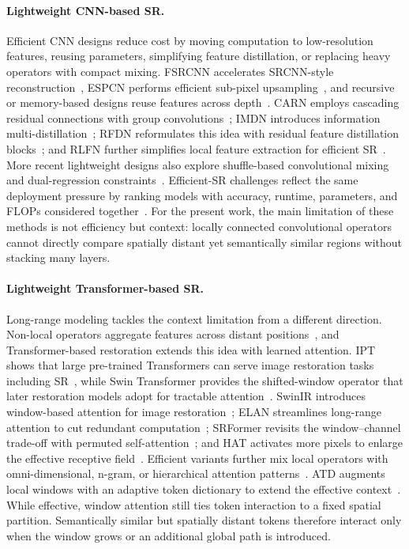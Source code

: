\paragraph{Lightweight CNN-based SR.}
Efficient CNN designs reduce cost by moving computation to low-resolution
features, reusing parameters, simplifying feature distillation, or replacing
heavy operators with compact mixing. FSRCNN accelerates SRCNN-style
reconstruction~\cite{dong2016fsrcnn}, ESPCN performs efficient sub-pixel
upsampling~\cite{shi2016espcn}, and recursive or memory-based designs reuse
features across depth~\cite{tai2017drrn,tai2017memnet}. CARN employs cascading
residual connections with group convolutions~\cite{ahn2018carn}; IMDN introduces
information multi-distillation~\cite{hui2019imdn}; RFDN reformulates this idea
with residual feature distillation blocks~\cite{liu2020rfdn}; and RLFN further
simplifies local feature extraction for efficient SR~\cite{kong2022rlfn}. More
recent lightweight designs also explore shuffle-based convolutional mixing and
dual-regression constraints~\cite{sun2022shufflemixer,guo2022dualregression}.
Efficient-SR challenges reflect the same deployment pressure by ranking models
with accuracy, runtime, parameters, and FLOPs considered together~\cite{ren2024ntire}.
For the present work, the main limitation of these methods is not efficiency but
context: locally connected convolutional operators cannot directly compare spatially
distant yet semantically similar regions without stacking many layers.

\paragraph{Lightweight Transformer-based SR.}
Long-range modeling tackles the context limitation from a different direction.
Non-local operators aggregate features across distant positions~\cite{wang2018nonlocal},
and Transformer-based restoration extends this idea with learned attention.
IPT shows that large pre-trained Transformers can serve image restoration tasks
including SR~\cite{chen2021ipt}, while Swin Transformer provides the shifted-window
operator that later restoration models adopt for tractable attention~\cite{liu2021swin}.
SwinIR introduces window-based attention for image restoration~\cite{liang2021swinir};
ELAN streamlines long-range attention to cut redundant computation~\cite{zhang2022elan};
SRFormer revisits the window--channel trade-off with permuted
self-attention~\cite{zhou2023srformer}; and HAT activates more pixels to enlarge the
effective receptive field~\cite{chen2023hat}. Efficient variants further mix local
operators with omni-dimensional, n-gram, or hierarchical attention
patterns~\cite{zheng2023emt,wang2023omnisr,choi2023ngswin,liu2022hpinet}.
ATD augments local windows with an adaptive token dictionary to extend the
effective context~\cite{zhang2024atd}. While effective, window attention still
ties token interaction to a fixed spatial partition. Semantically similar but
spatially distant tokens therefore interact only when the window grows or an
additional global path is introduced.

